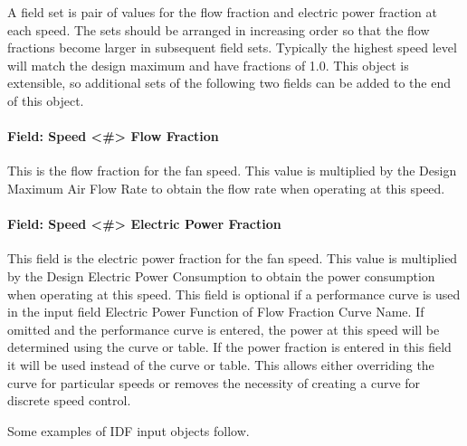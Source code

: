A field set is pair of values for the flow fraction and electric power fraction at each speed. The sets should be arranged in increasing order so that the flow fractions become larger in subsequent field sets.  Typically the highest speed level will match the design maximum and have fractions of 1.0.  This object is extensible, so additional sets of the following two fields can be added to the end of this object.

\paragraph{Field: Speed <\#> Flow Fraction}\label{field-speed-flow-fraction-fansysmodel}
This is the flow fraction for the fan speed. This value is multiplied by the Design Maximum Air Flow Rate to obtain the flow rate when operating at this speed.

\paragraph{Field: Speed <\#> Electric Power Fraction}\label{field-speed-power-fraction-fansysmodel}

This field is the electric power fraction for the fan speed. This value is multiplied by the Design Electric Power Consumption to obtain the power consumption when operating at this speed. This field is optional if a performance curve is used in the input field Electric Power Function of Flow Fraction Curve Name.  If omitted and the performance curve is entered, the power at this speed will be determined using the curve or table.  If the power fraction is entered in this field it will be used instead of the curve or table. This allows either overriding the curve for particular speeds or removes the necessity of creating a curve for discrete speed control.

Some examples of IDF input objects follow.

